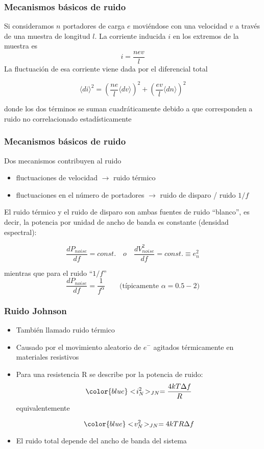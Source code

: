 \documentclass{beamer}
\begin{document}
\begin{frame}
\frametitle{Mecanismos b\'asicos de ruido}
\begin{block}{}
Si consideramos $n$ portadores de carga $e$ movi\'endose
con una velocidad $v$ a trav\'es de una muestra de longitud
$l$. La corriente inducida $i$ en los extremos de la muestra es
$$i = \frac{nev}{l}$$
La fluctuaci\'on de esa corriente viene dada por el diferencial total

$$\langle di \rangle^2 = \left(\frac{ne}{l}\langle dv \rangle \right)^2 +
\left(\frac{ev}{l}\langle dn \rangle \right)^2 $$

donde los dos t\'erminos \alert{se suman cuadr\'aticamente debido a que corresponden a ruido
no correlacionado estad\'isticamente}
\end{block}
\end{frame} 

\begin{frame}
\frametitle{Mecanismos b\'asicos de ruido}
{\color{blue}Dos mecanismos contribuyen al ruido}
\begin{itemize}
\item fluctuaciones de velocidad $\rightarrow$ {\color[rgb]{0.8,0.33,0}ruido t\'ermico}
\item fluctuaciones en el n\'umero de portadores $\rightarrow$
{\color[rgb]{0.43,0.21,0.1}ruido de disparo / ruido
$1/f$}
\end{itemize}
El ruido t\'ermico y el ruido de disparo son ambas fuentes de ruido ``blanco'', es
decir, la potencia por unidad de ancho de banda es constante (\alert{densidad
espectral}):

$$\frac{dP_{noise}}{df} = const. \quad o
\quad \frac{dV_{noise}^2}{df} = const. \equiv
e_n^2$$

mientras que para el ruido ``$1/f$''
$$\frac{dP_{noise}}{df} =
\frac{1}{f^\alpha} \qquad \text{(t\'ipicamente $\alpha = 0.5 - 2$)}$$
\end{frame} 

\begin{frame}
\frametitle{Ruido Johnson}
\begin{alertblock}{}
\begin{itemize}
\item Tambi\'en llamado ruido t\'ermico
\item Causado por el movimiento aleatorio de $e^-$ agitados t\'ermicamente en
materiales resistivos
\item Para una resistencia R se describe por la potencia de ruido:
$${\color{blue}<\!i_N^2\!>_{JN} = \frac{4kT\Delta f}{R}}$$
equivalentemente

$${\color{blue}<\!v_N^2\!>_{JN} = 4kTR\Delta f}$$
\item \alert{El ruido total depende del ancho de banda del sistema}
\end{itemize}
\end{alertblock}
\end{frame} 
\end{document}
